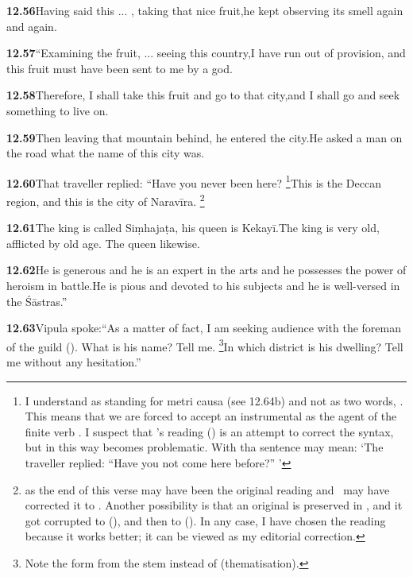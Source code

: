 \textbf{12.56}Having said this ... , taking that nice fruit,he kept observing its smell again and again.%


\textbf{12.57}``Examining the fruit, ... seeing this country,I have run out of provision, and this fruit must have been sent to me by a god.%


\textbf{12.58}Therefore, I shall take this fruit and go to that city,and I shall go and seek something to live on.%


\textbf{12.59}Then leaving that mountain behind, he entered the city.He asked a man on the road what the name of this city was.%


\textbf{12.60}That traveller replied: ``Have you never been here?%
\footnote{I understand  as standing for  metri causa (see 12.64b) and not               as two words, . This means that we are forced to accept an instrumental as the agent                of the finite verb . I suspect that \msNc's reading ()                is an attempt to correct the syntax, but in this way  becomes                problematic. With  tha sentence may mean: `The traveller replied:                 ``Have you not come here before?'' '  }This is the Deccan region, and this is the city of Naravīra.%
\footnote{ as the end of this verse may have been the original reading and                 \msCb\ may have corrected it to . Another possibility is that                 an original  is preserved in \msCb, and it got corrupted to                  (\msCa), and then to  (\msCc\msNa).                  In any case, I have chosen the reading                  because it works better; it can be viewed as my editorial correction.  }%


\textbf{12.61}The king is called Siṃhajaṭa, his queen is Kekayī.The king is very old, afflicted by old age. The queen likewise.%


\textbf{12.62}He is generous and he is an expert in the arts and he possesses                the power of heroism in battle.He is pious and devoted to his subjects and he is well-versed in the Śāstras.''%


\textbf{12.63}Vipula spoke:``As a matter of fact, I am seeking audience with the foreman of                the guild (). What is his name? Tell me.%
\footnote{Note the form  from the stem  instead of  (thematisation).  }In which district is his dwelling? Tell me without any hesitation.''%


